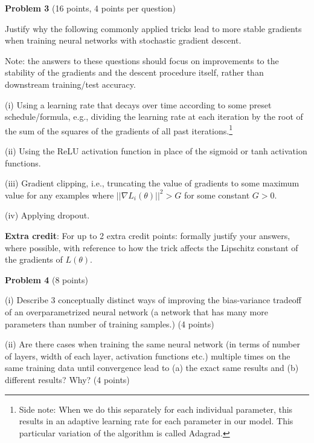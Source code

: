 \documentclass[letterpaper, 11pt]{article}
\newcommand{\problemAnswer}[1]{%
	\noindent\framebox[0.95\columnwidth][c]{\begin{minipage}{0.92\columnwidth}\color{blue}{#1}\end{minipage}} %
}
\begin{document}
\vspace{1em}


{\large\textbf{Problem 3}} (16 points, 4 points per question)

Justify why the following commonly applied tricks lead to more stable gradients  when training neural networks with stochastic gradient descent.  

Note: the answers to these questions should focus on improvements to the stability of the gradients and the descent procedure itself, rather than downstream training/test accuracy.

(i) Using a learning rate that decays over time according to some preset schedule/formula, e.g., dividing the learning rate at each iteration by the root of the sum of the squares of the gradients of all past iterations.\footnote{Side note: When we do this separately for each individual parameter, this results in an adaptive learning rate for each parameter in our model. This particular variation of the algorithm is called Adagrad.}

(ii) Using the ReLU activation function in place of the sigmoid or tanh activation functions.

(iii) Gradient clipping, i.e., truncating the value of gradients to some maximum value for any examples where $||\nabla L_i	(\theta)||^2 > G$ for  some  constant $G > 0$.

(iv) Applying dropout.

\textbf{Extra credit}: For up to 2 extra credit points: formally justify your answers, where possible, with reference to how the trick affects the Lipschitz constant of the gradients of $L(\theta)$.

\problemAnswer{
	
	
	\vspace*{100pt}
}

\vspace{1em}




{\large\textbf{Problem 4}} (8 points)

(i) Describe 3 conceptually distinct ways of improving the bias-variance tradeoff of an overparametrized neural network (a network that has many more parameters than number of training samples.) (4 points)

(ii) Are there cases when training the same neural network (in terms of number of layers, width of each layer, activation functions etc.) multiple times on the same training data until convergence lead to (a) the exact same results and (b) different results? Why? (4 points)
\end{document}
